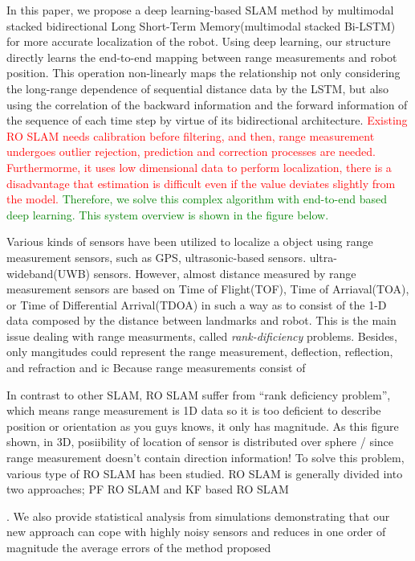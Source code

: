 \documentclass{ieeeaccess}
\begin{document}
In this paper, we propose a deep learning-based SLAM method by multimodal stacked bidirectional Long Short-Term Memory(multimodal stacked Bi-LSTM) for more accurate localization of the robot. Using deep learning, our structure directly learns the end-to-end mapping between range measurements and robot position. This operation non-linearly maps the relationship not only considering the long-range dependence of sequential distance data by the LSTM, but also using the correlation of the backward information and the forward information of the sequence of each time step by virtue of its bidirectional architecture. \textcolor{red}{Existing RO SLAM needs calibration before filtering, and then, range measurement undergoes outlier rejection, prediction and correction processes are needed.	Furthermorme, it uses low dimensional data to perform localization, there is a disadvantage that estimation is difficult even if the value deviates slightly from the model.} \textcolor{green}{Therefore, we solve this complex algorithm with end-to-end based deep learning. This system overview is shown in the figure below.}

Various kinds of sensors have been utilized to localize a object using range measurement sensors, such as GPS, ultrasonic-based sensors. ultra-wideband(UWB) sensors. However, almost distance measured by range measurement sensors are based on Time of Flight(TOF), Time of Arriaval(TOA)\cite{jung2011indoor}, or Time of Differential Arrival(TDOA) in such a way as to consist of the 1-D data composed by the distance between landmarks and robot. This is the main issue dealing with range measurments, called \textit{rank-dificiency} problems. Besides, only mangitudes could represent the range measurement, deflection, reflection, and refraction and ic  Because range measurements consist of    


In contrast to other SLAM, RO SLAM suffer from “rank deficiency problem”, which means range measurement is 1D data so it is too deficient to describe position or orientation as you guys knows, it only has magnitude. As this figure shown, in 3D, posiibility of location of sensor is distributed over sphere / since range measurement doesn’t contain direction information!
To solve this problem, various type of RO SLAM has been studied. RO SLAM is generally divided into two approaches; PF RO SLAM and KF based RO SLAM

. We also provide statistical analysis from simulations demonstrating that
our new approach can cope with highly noisy sensors and
reduces in one order of magnitude the average errors of the
method proposed
\end{document}
